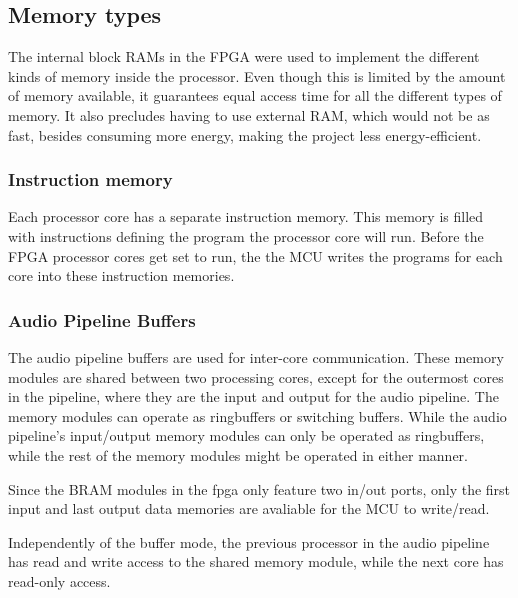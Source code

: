 \subsection{Memory types}\label{subsec:fpga-memory}

The internal block RAMs in the FPGA were used to implement the different kinds
of memory inside the processor. Even though this is limited by the amount of
memory available, it guarantees equal access time for all the different types
of memory. It also precludes having to use external RAM, which would not be as
fast, besides consuming more energy, making the project less energy-efficient.

\subsubsection{Instruction memory}
Each processor core has a separate instruction memory. This memory is filled
with instructions defining the program the processor core will run. Before the
FPGA processor cores get set to run, the the MCU writes the programs for each
core into these instruction memories.

\subsubsection{Audio Pipeline Buffers}
The audio pipeline buffers are used for inter-core communication. These memory
modules are shared between two processing cores, except for the outermost cores
in the pipeline, where they are the input and output for the audio pipeline. The
memory modules can operate as ringbuffers or switching buffers. While the audio
pipeline's input/output memory modules can only be operated as ringbuffers,
while the rest of the memory modules might be operated in either manner.

Since the BRAM modules in the fpga only feature two in/out ports, only the
first input and last output data memories are avaliable for the MCU to
write/read.

Independently of the buffer mode, the previous processor in the audio pipeline
has read and write access to the shared memory module, while the next core has
read-only access.

